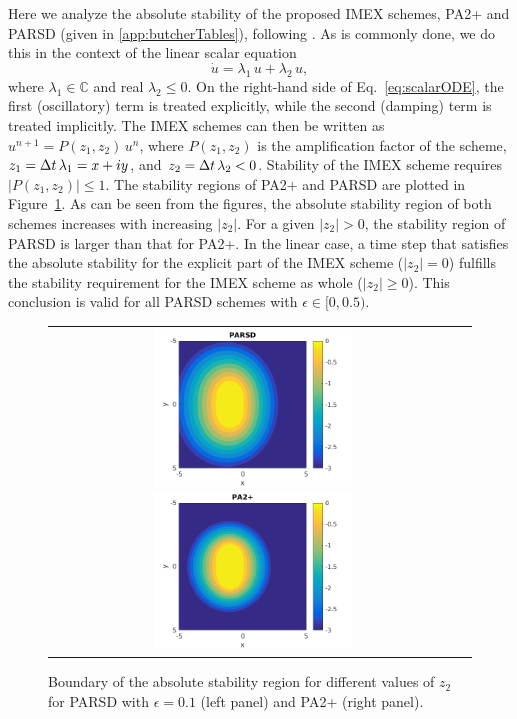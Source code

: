 Here we analyze the absolute stability of the proposed IMEX schemes, PA2+ and PARSD (given in \ref{app:butcherTables}), following \cite{hu_etal_2018}.  
As is commonly done, we do this in the context of the linear scalar equation
\begin{equation}
  \dot{u}=\lambda_{1}\,u+\lambda_{2}\,u,
  \label{eq:scalarODE}
\end{equation}
where $\lambda_{1}\in\mathbb{C}$ and real $\lambda_{2}\le0$.  
On the right-hand side of Eq.~\eqref{eq:scalarODE}, the first (oscillatory) term is treated explicitly, while the second (damping) term is treated implicitly.  
The IMEX schemes can then be written as $u^{n+1} =P(z_{1},z_{2})\,u^{n}$, where $P(z_{1},z_{2})$ is the amplification factor of the scheme, $z_{1}=\Delta t\,\lambda_{1} = x +iy$, and $z_{2} = \Delta t\,\lambda_{2} < 0$.  
Stability of the IMEX scheme requires $|P(z_1,z_2)|\leq 1$.  
The stability regions of PA2+ and PARSD are plotted in Figure~\ref{fig:AbsoluteStability}.  
As can be seen from the figures, the absolute stability region of both schemes increases with increasing $|z_{2}|$.  
For a given $|z_{2}|>0$, the stability region of PARSD is larger than that for PA2+.  
In the linear case, a time step that satisfies the absolute stability for the explicit part of the IMEX scheme ($|z_2| = 0$) fulfills the stability requirement for the IMEX scheme as whole ($|z_2| \geq 0$).  
This conclusion is valid for all PARSD schemes with $\epsilon\in [0,0.5)$.
\begin{figure}[h]
  \centering
  \begin{tabular}{cc}
    \includegraphics[width=0.5\textwidth]{figures/AbsoluteStabilityPARSD}
    \includegraphics[width=0.5\textwidth]{figures/AbsoluteStabilityPA2+}
  \end{tabular}
   \caption{Boundary of the absolute stability region for different values of $z_2$ for PARSD with $\epsilon = 0.1$ (left panel) and PA2+ (right panel).}
  \label{fig:AbsoluteStability}
\end{figure}